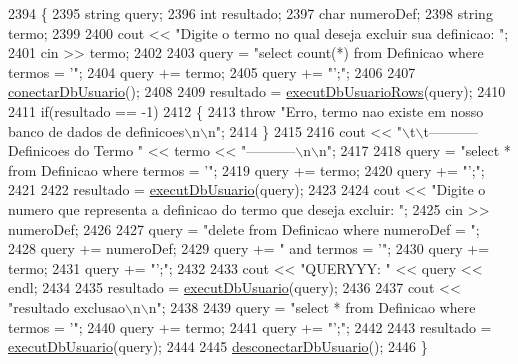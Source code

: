 \begin{DoxyCode}
2394     \{
2395       \textcolor{keywordtype}{string} query;
2396       \textcolor{keywordtype}{int} resultado;
2397       \textcolor{keywordtype}{char} numeroDef;
2398       \textcolor{keywordtype}{string} termo;
2399 
2400       cout << \textcolor{stringliteral}{"Digite o termo no qual deseja excluir sua definicao: "};
2401       cin >> termo;
2402 
2403       query = \textcolor{stringliteral}{"select count(*) from Definicao where termos = '"};
2404       query += termo;
2405       query += \textcolor{stringliteral}{"';"};
2406 
2407       \mbox{\hyperlink{comando_sql_8cpp_a4f89ddcbc4cf8f2587d89f72f8c7900d}{conectarDbUsuario}}();
2408 
2409       resultado = \mbox{\hyperlink{comando_sql_8cpp_af54952694f2fa7d76f969fb74b853cb9}{executDbUsuarioRows}}(query);
2410 
2411       \textcolor{keywordflow}{if}(resultado == -1)
2412       \{
2413         \textcolor{keywordflow}{throw} \textcolor{stringliteral}{"Erro, termo nao existe em nosso banco de dados de definicoes\(\backslash\)n\(\backslash\)n"};
2414       \}
2415 
2416       cout << \textcolor{stringliteral}{"\(\backslash\)t\(\backslash\)t----------- Definicoes do Termo "} << termo << \textcolor{stringliteral}{"-----------\(\backslash\)n\(\backslash\)n"};
2417 
2418       query = \textcolor{stringliteral}{"select * from Definicao where termos = '"};
2419       query += termo;
2420       query += \textcolor{stringliteral}{"';"};
2421 
2422       resultado = \mbox{\hyperlink{comando_sql_8cpp_a748197580e7f9acdbf48c78de1f7924b}{executDbUsuario}}(query);
2423 
2424       cout << \textcolor{stringliteral}{"Digite o numero que representa a definicao do termo que deseja excluir: "};
2425       cin >> numeroDef;
2426 
2427       query = \textcolor{stringliteral}{"delete from Definicao where numeroDef = "};
2428       query += numeroDef;
2429       query += \textcolor{stringliteral}{" and termos = '"};
2430       query += termo;
2431       query += \textcolor{stringliteral}{"';"};
2432 
2433       cout << \textcolor{stringliteral}{"QUERYYY: "} << query << endl;
2434 
2435       resultado = \mbox{\hyperlink{comando_sql_8cpp_a748197580e7f9acdbf48c78de1f7924b}{executDbUsuario}}(query);
2436 
2437       cout << \textcolor{stringliteral}{"resultado exclusao\(\backslash\)n\(\backslash\)n"};
2438 
2439       query = \textcolor{stringliteral}{"select * from Definicao where termos = '"};
2440       query += termo;
2441       query += \textcolor{stringliteral}{"';"};
2442 
2443       resultado = \mbox{\hyperlink{comando_sql_8cpp_a748197580e7f9acdbf48c78de1f7924b}{executDbUsuario}}(query);
2444 
2445       \mbox{\hyperlink{comando_sql_8cpp_a969be9911913568e30d4ae8963338bc3}{desconectarDbUsuario}}();
2446     \}
\end{DoxyCode}
\mbox{\label{class_servico_usuarios_administrador_a90abacb7bb051878e6b016d9993733c1}} 
